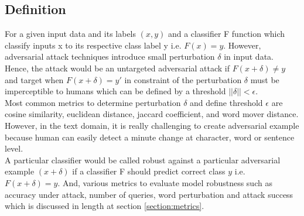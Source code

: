\documentclass[%
	BCOR=8mm, %
	DIV=12,
	toc=bibliography, %
	toc=listof, %
	oneside, %
	egregdoesnotlikesansseriftitles, %
	]{scrbook}
\begin{document}
\subsection{Definition}
\label{subsection:definition}
For a given input data and its labels $(x, y)$ and a classifier F function which classify inputs x to its respective class label y i.e. $F (x) = y$. However, adversarial attack techniques introduce small perturbation $\delta$ in input data.\\
Hence, the attack would be an untargeted adversarial attack if $F(x+\delta)\not=y$ and target when $F(x+\delta)=y'$ in constraint of the perturbation $\delta$ must be imperceptible to humans which can be defined by a threshold  $||\delta||<\epsilon$. \\
Most common metrics to determine perturbation $\delta$ and define threshold $\epsilon$ are cosine similarity, euclidean distance, jaccard coefficient, and word mover distance.  However, in the text domain, it is really challenging to create adversarial example because human can easily detect a minute change at character, word or sentence level.\\
A particular classifier would be called robust against a particular adversarial example  $(x+\delta)$ if a classifier F should predict correct class $y$  i.e.  $F(x+\delta)=y$. And, various metrics to evaluate model robustness such as accuracy under attack, number of queries, word perturbation and  attack success which is discussed in length at section \ref{section:metrics}.
\end{document}
